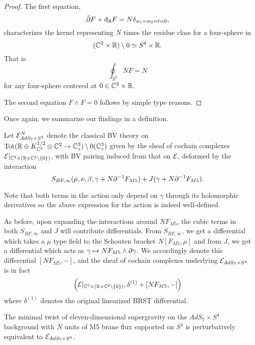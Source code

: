 \begin{proof}
The first equation,
\[
\bar{\partial} F + \mathrm{d}_{\mathbb{R}} F = N \delta_{w_1=w_2=t=0},
\]
characterizes the kernel representing $N$ times the residue class for a four-sphere in 
\[
(\mathbb{C}^2 \times \mathbb{R}) \setminus 0 \simeq S^4 \times \mathbb{R} .
\] 
That is
\[
\oint_{S^4} N F = N 
\]
for any four-sphere centered at $0 \in \mathbb{C}^2 \times \mathbb{R}$.

The second equation $F \wedge F = 0$ follows by simple type reasons. 
\end{proof}

Once again, we summarize our findings in a definition. 
\begin{defn}\label{defn:ads7}
Let $\mathcal{E}^N_{AdS_7\times S^4}$ denote the classical BV theory on $\operatorname{Tot}(\mathbb{R} \oplus K_{\mathbb{C}^3}^{1/2}\otimes \mathbb{C}^2 \to \mathbb{C}^3_z)\setminus 0(\mathbb{C}^3_z)$ given by the sheaf of cochain complexes $\mathcal{E} |_{\mathbb{C}^3\times (\mathbb{R}\times \mathbb{C}^2\setminus \{0\} )}$, with BV pairing induced from that on $\mathcal{E}$, deformed by the interaction \[S_{BF,\infty}(\mu, \nu, \beta, \gamma +N\partial^{-1} F_{M5}) + J(\gamma + N \partial^{-1} F_{M5}).\]
\end{defn}

\begin{rmk}
Note that both terms in the action only depend on $\gamma$ through its holomorphic derivatives so the above expression for the action is indeed well-defined. 

As before, upon expanding the interactions around $NF_{M5}$, the cubic terms in both $S_{BF,\infty}$ and $J$ will contribute differentials. From $S_{BF,\infty}$, we get a differential which takes a $\mu$ type field to the Schouten bracket $N[F_{M5}, \mu]$ and from $J$, we get a differential which acts as $\gamma\mapsto N F_{M5} \wedge \partial \gamma$. We accordingly denote this differential $[NF_{M5}, - ] $, and the sheaf of cochain complexes underlying $\mathcal{E}_{AdS_7\times S^4}$ is in fact \[\left (\mathcal{E} |_{\mathbb{C}^3\times (\mathbb{R}\times \mathbb{C}^2\setminus \{0\} )}, \delta^{(1)} + [NF_{M5},-] \right )\] where $\delta^{(1)}$ denotes the original linearized BRST differential.
\end{rmk}

\begin{conj}\label{conj:ads7}
The minimal twist of eleven-dimensional supergravity on the $AdS_7\times S^4$ background with $N$ units of M5 brane flux supported on $S^4$ is perturbatively equivalent to $\mathcal{E}_{AdS_7\times S^4}$. 
\end{conj}
